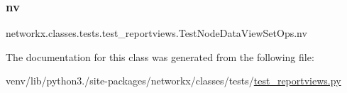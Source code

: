 \subsubsection{\texorpdfstring{nv}{nv}}
{\footnotesize\ttfamily networkx.\+classes.\+tests.\+test\+\_\+reportviews.\+Test\+Node\+Data\+View\+Set\+Ops.\+nv}



The documentation for this class was generated from the following file\+:\begin{DoxyCompactItemize}
\item 
venv/lib/python3./site-\/packages/networkx/classes/tests/\hyperlink{test__reportviews_8py}{test\+\_\+reportviews.\+py}\end{DoxyCompactItemize}
